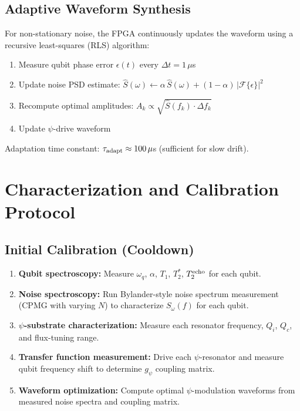 \documentclass[11pt,letterpaper]{article}
\begin{document}
\subsection{Adaptive Waveform Synthesis}

For non-stationary noise, the FPGA continuously updates the waveform
using a recursive least-squares (RLS) algorithm:
\begin{enumerate}
\item Measure qubit phase error $\epsilon(t)$ every $\Delta t = 1\,\mu$s
\item Update noise PSD estimate: $\hat{S}(\omega) \leftarrow \alpha\,
\hat{S}(\omega) + (1-\alpha)\,|\mathcal{F}\{\epsilon\}|^2$
\item Recompute optimal amplitudes: $A_k \propto \sqrt{\hat{S}(f_k)
\cdot \Delta f_k}$
\item Update $\psi$-drive waveform
\end{enumerate}
Adaptation time constant: $\tau_{\rm adapt} \approx 100\,\mu$s
(sufficient for slow drift).

\section{Characterization and Calibration Protocol}

\subsection{Initial Calibration (Cooldown)}

\begin{enumerate}
\item \textbf{Qubit spectroscopy:} Measure $\omega_q$, $\alpha$, $T_1$,
$T_2^*$, $T_2^{\rm echo}$ for each qubit.
\item \textbf{Noise spectroscopy:} Run Bylander-style noise spectrum
measurement (CPMG with varying $N$) to characterize $S_\omega(f)$ for
each qubit.
\item \textbf{$\psi$-substrate characterization:} Measure each resonator
frequency, $Q_i$, $Q_c$, and flux-tuning range.
\item \textbf{Transfer function measurement:} Drive each $\psi$-resonator
and measure qubit frequency shift to determine $g_\psi$ coupling matrix.
\item \textbf{Waveform optimization:} Compute optimal $\psi$-modulation
waveforms from measured noise spectra and coupling matrix.
\end{enumerate}
\end{document}
